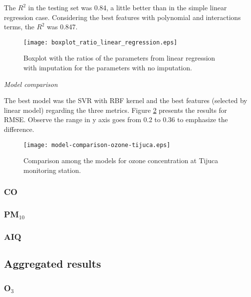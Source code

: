 The $R^2$ in the testing set was 0.84, a little better than in the simple
linear regression case. Considering the best features with polynomial and
interactions terms, the $R^2$ was 0.847.

\begin{figure}
    \centering
    \texttt{[image: boxplot\_ratio\_linear\_regression.eps]}
    \caption{Boxplot with the ratios of the parameters from linear regression
    with imputation for the parameters with no imputation.}
    \label{fig:boxplot-linear-regression}
\end{figure}

\vspace{2mm}

{\em Model comparison} 

\vspace{2mm}

The best model was the SVR with RBF kernel and the best features
(selected by linear model) regarding the three metrics. Figure
\ref{fig:model-comparison-ozone-tijuca} presents the results for RMSE. Observe
the range in y axis goes from 0.2 to 0.36 to emphasize the difference.

\begin{figure}
    \centering
    \texttt{[image: model-comparison-ozone-tijuca.eps]}
    \caption{Comparison among the models for ozone concentration at Tijuca monitoring station.}
    \label{fig:model-comparison-ozone-tijuca}
\end{figure}

\subsubsection{CO}

\subsubsection{PM\texorpdfstring{$_{10}$}{10}}

\subsubsection{AIQ}

\subsection{Aggregated results}

\subsubsection{O\texorpdfstring{$_3$}{3}}

